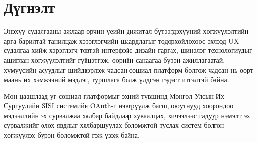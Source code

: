 \chapter{Дүгнэлт}

Энэхүү судалгааны ажлаар орчин үеийн дижитал бүтээгдэхүүний хөгжүүлэлтийн арга барилтай танилцаж хэрэглэгчийн шаардлагыг тодорхойлохоос эхлээд UX судалгаа хийж хэрэглэгч төвтэй интерфэйс дизайн гаргах, шинэлэг технологиудыг ашиглан хөгжүүлэлтийг гүйцэтгэж, өөрийн санаагаа бүрэн ажиллагаатай, хүмүүсийн асуудлыг шийдвэрлэж чадсан сошиал платформ болгож чадсан нь өөрт маань их хэмжээний мэдлэг, туршлага болж үлдсэн гэдэгт итгэлтэй байна.

Мөн цаашлаад уг сошиал платформыг эхний түвшинд Монгол Улсын Их Сургуулийн SISI системийн OAuth-г нэвтрүүлж багш, оюутнууд хоорондоо мэдээллийн эх сурвалжаа хялбар байдлаар хуваалцах, хичээлээс гадуур нэмэлт эх сурвалжийг олох явдлыг хялбаршуулах боломжтой туслах систем болгон хөгжүүлэх бүрэн боломжтой гэж үзэж байна.